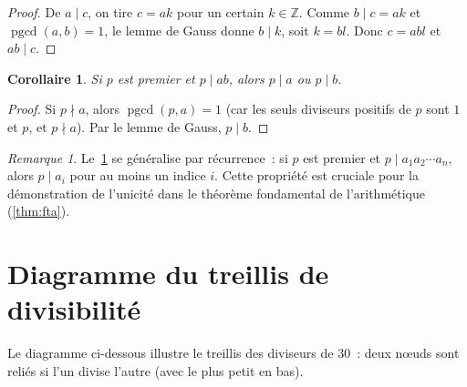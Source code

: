 \documentclass[12pt,a4paper,openany]{book}
\theoremstyle{definition}
\theoremstyle{plain}
\newtheorem{corollaire}[definition]{Corollaire}
\theoremstyle{remark}
\newtheorem{remarque}[definition]{Remarque}
\newcommand{\Z}{\mathbb{Z}}
\DeclareMathOperator{\pgcd}{pgcd}
\begin{document}
\begin{proof}
De $a \mid c$, on tire $c = ak$ pour un certain $k \in \Z$. Comme $b \mid c = ak$
et $\pgcd(a,b) = 1$, le lemme de Gauss donne $b \mid k$, soit $k = bl$. Donc
$c = abl$ et $ab \mid c$.
\end{proof}

\begin{corollaire}
\label{cor:gauss:premier_divise_produit}
Si $p$ est premier et $p \mid ab$, alors $p \mid a$ ou $p \mid b$.
\end{corollaire}

\begin{proof}
Si $p \nmid a$, alors $\pgcd(p,a) = 1$ (car les seuls diviseurs positifs de $p$ sont
$1$ et $p$, et $p \nmid a$). Par le lemme de Gauss, $p \mid b$.
\end{proof}

\begin{remarque}
\label{rem:gauss:generalisation}
Le~\ref{cor:gauss:premier_divise_produit} se généralise par récurrence~: si $p$ est
premier et $p \mid a_1 a_2 \cdots a_n$, alors $p \mid a_i$ pour au moins un indice
$i$. Cette propriété est cruciale pour la démonstration de l'unicité dans le théorème
fondamental de l'arithmétique (\ref{thm:fta}).
\end{remarque}

\section{Diagramme du treillis de divisibilité}
\label{sec:ch1:tikz}

Le diagramme ci-dessous illustre le treillis des diviseurs de $30$~: deux n\oe uds sont reliés si l'un divise l'autre (avec
le plus petit en bas).

\begin{center}
\label{fig:treillis_30}
\end{center}
\end{document}
